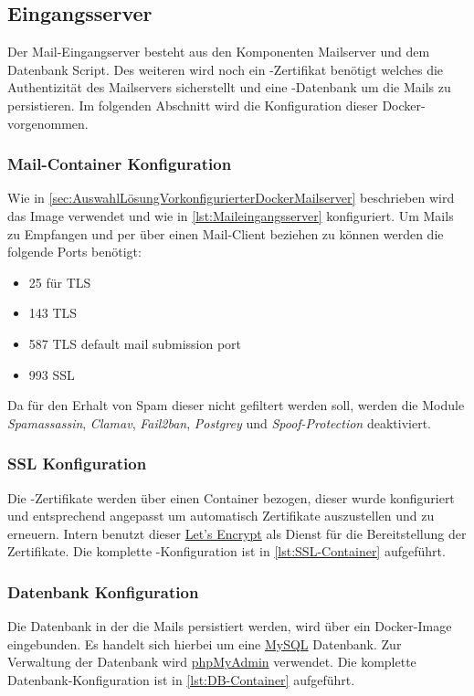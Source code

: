 \documentclass[a4paper,11pt,singlespacing]{article}
\begin{document}
	\subsection{Eingangsserver}\label{sec:UmsetzungEingangsserver}
		Der Mail-Eingangserver besteht aus den Komponenten Mailserver und dem Datenbank Script.
		Des weiteren wird noch ein -Zertifikat benötigt welches die Authentizität des Mailservers sicherstellt und eine -Datenbank um die Mails zu persistieren.
		Im folgenden Abschnitt wird die Konfiguration dieser Docker- vorgenommen.

		\subsubsection{Mail-Container Konfiguration}\label{Mail-In-Container}
			Wie in \autoref{sec:AuswahlLösungVorkonfigurierterDockerMailserver} beschrieben wird das Image verwendet und wie in \autoref{lst:Maileingangsserver} konfiguriert.
			Um Mails zu Empfangen und per  über einen Mail-Client beziehen zu können werden die folgende Ports benötigt:
			\begin{itemize}
				\item 25 für TLS 
				\item 143 TLS 
				\item 587 TLS default mail submission port
				\item 993 SSL 
			\end{itemize}
			Da für den Erhalt von Spam dieser nicht gefiltert werden soll, werden die Module \textit{Spamassassin}, \textit{Clamav}, \textit{Fail2ban}, \textit{Postgrey} und \textit{Spoof-Protection} deaktiviert.
			
		\subsubsection{SSL Konfiguration}\label{SSL-Container}
			Die -Zertifikate werden über einen Container bezogen, dieser wurde konfiguriert und entsprechend angepasst um automatisch Zertifikate auszustellen und zu erneuern.
			Intern benutzt dieser \href{https://letsencrypt.org/}{Let's Encrypt} als Dienst für die Bereitstellung der Zertifikate.
			Die komplette -Konfiguration ist in \autoref{lst:SSL-Container} aufgeführt.

		\subsubsection{Datenbank Konfiguration}\label{DB-Container}
			Die Datenbank in der die Mails persistiert werden, wird über ein Docker-Image eingebunden.
			Es handelt sich hierbei um eine \href{https://www.mysql.com/de/}{MySQL} Datenbank.
			Zur Verwaltung der Datenbank wird \href{https://www.phpmyadmin.net/}{phpMyAdmin} verwendet.
			Die komplette Datenbank-Konfiguration ist in \autoref{lst:DB-Container} aufgeführt.
\end{document}
